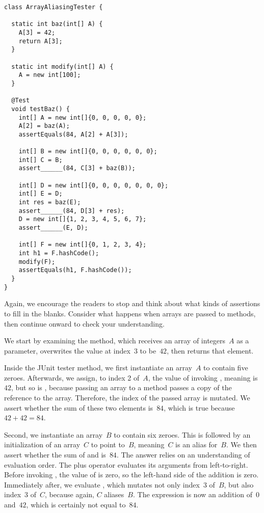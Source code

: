 \begin{lstlisting}[language=MyJava]
class ArrayAliasingTester {

  static int baz(int[] A) {
    A[3] = 42;
    return A[3];
  }

  static int modify(int[] A) {
    A = new int[100];
  }

  @Test
  void testBaz() {
    int[] A = new int[]{0, 0, 0, 0, 0};
    A[2] = baz(A);
    assertEquals(84, A[2] + A[3]);

    int[] B = new int[]{0, 0, 0, 0, 0, 0};
    int[] C = B;
    assert______(84, C[3] + baz(B));

    int[] D = new int[]{0, 0, 0, 0, 0, 0, 0};
    int[] E = D;
    int res = baz(E);
    assert______(84, D[3] + res);  
    D = new int[]{1, 2, 3, 4, 5, 6, 7};
    assert______(E, D);  

    int[] F = new int[]{0, 1, 2, 3, 4};
    int h1 = F.hashCode();
    modify(F);
    assertEquals(h1, F.hashCode());
  }
}
\end{lstlisting}

Again, we encourage the readers to stop and think about what kinds of assertions to fill in the blanks. Consider what happens when arrays are passed to methods, then continue onward to check your understanding.

We start by examining the  method, which receives an array of integers~$A$ as a parameter, overwrites the value at index~$3$ to be~$42$, then returns that element. 

Inside the JUnit tester method, we first instantiate an array~$A$ to contain five zeroes. Afterwards, we assign, to index 2 of~$A$, the value of invoking , meaning  is $42$, but so is , because passing an array to a method passes a copy of the reference to the array. 
Therefore, the index of the passed array is mutated. 
We assert whether the sum of these two elements is~$84$, which is true because $42+42=84$.

Second, we instantiate an array~$B$ to contain six zeroes. This is followed by an initialization of an array~$C$ to point to~$B$, meaning~$C$ is an alias for~$B$. We then assert whether the sum of  and  is~$84$. The answer relies on an understanding of evaluation order. The plus operator evaluates its arguments from left-to-right. Before invoking , the value of  is zero, so the left-hand side of the addition is zero. Immediately after, we evaluate , which mutates not only index~$3$ of~$B$, but also index~$3$ of~$C$, because again, $C$ aliases~$B$. The expression is now an addition of~$0$ and~$42$, which is certainly not equal to~$84$.

